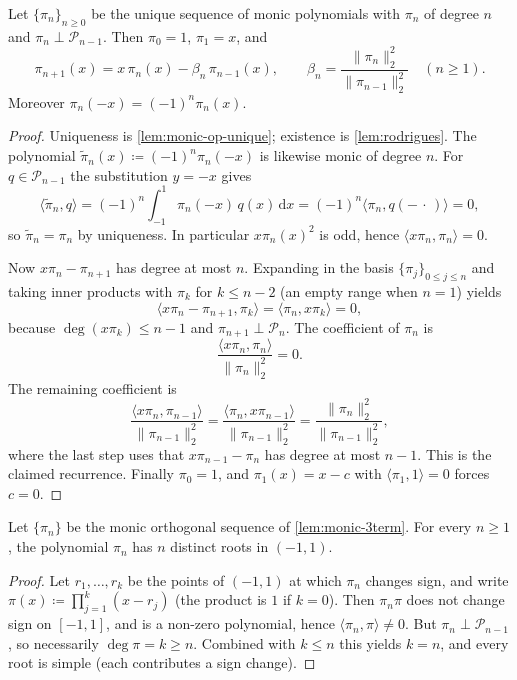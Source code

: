 \documentclass[11pt,a4paper]{article}
\begin{document}
\begin{lemma}
\label{lem:monic-3term}
Let \(\{\pi_{n}\}_{n\ge 0}\) be the unique sequence of monic polynomials with \(\pi_{n}\) of degree \(n\) and \(\pi_{n}\perp\mathcal{P}_{n-1}\). Then \(\pi_{0}=1\), \(\pi_{1}=x\), and
\[
\pi_{n+1}(x)
=
x\,\pi_{n}(x)
-
\beta_{n}\,\pi_{n-1}(x),
\qquad
\beta_{n}
=
\frac{\|\pi_{n}\|_{2}^{2}}{\|\pi_{n-1}\|_{2}^{2}}
\quad(n\ge 1).
\]
Moreover \(\pi_{n}(-x)=(-1)^{n}\pi_{n}(x)\).
\end{lemma}

\begin{proof}
Uniqueness is \cref{lem:monic-op-unique}; existence is \cref{lem:rodrigues}. The polynomial \(\widetilde{\pi}_{n}(x)\coloneqq(-1)^{n}\pi_{n}(-x)\) is likewise monic of degree \(n\). For \(q\in\mathcal{P}_{n-1}\) the substitution \(y=-x\) gives
\[
\langle\widetilde{\pi}_{n},q\rangle
=
(-1)^{n}
\int_{-1}^{1}\pi_{n}(-x)\,q(x)\,\mathrm{d}x
=
(-1)^{n}
\langle\pi_{n},q(-\,\cdot\,)\rangle
=
0,
\]
so \(\widetilde{\pi}_{n}=\pi_{n}\) by uniqueness. In particular \(x\pi_{n}(x)^{2}\) is odd, hence \(\langle x\pi_{n},\pi_{n}\rangle=0\).

Now \(x\pi_{n}-\pi_{n+1}\) has degree at most \(n\). Expanding in the basis \(\{\pi_{j}\}_{0\le j\le n}\) and taking inner products with \(\pi_{k}\) for \(k\le n-2\) (an empty range when \(n=1\)) yields
\[
\langle x\pi_{n}-\pi_{n+1},\pi_{k}\rangle
=
\langle\pi_{n},x\pi_{k}\rangle
=
0,
\]
because \(\deg(x\pi_{k})\le n-1\) and \(\pi_{n+1}\perp\mathcal{P}_{n}\). The coefficient of \(\pi_{n}\) is
\[
\frac{\langle x\pi_{n},\pi_{n}\rangle}{\|\pi_{n}\|_{2}^{2}}
=
0.
\]
The remaining coefficient is
\[
\frac{\langle x\pi_{n},\pi_{n-1}\rangle}{\|\pi_{n-1}\|_{2}^{2}}
=
\frac{\langle\pi_{n},x\pi_{n-1}\rangle}{\|\pi_{n-1}\|_{2}^{2}}
=
\frac{\|\pi_{n}\|_{2}^{2}}{\|\pi_{n-1}\|_{2}^{2}},
\]
where the last step uses that \(x\pi_{n-1}-\pi_{n}\) has degree at most \(n-1\). This is the claimed recurrence. Finally \(\pi_{0}=1\), and \(\pi_{1}(x)=x-c\) with \(\langle\pi_{1},1\rangle=0\) forces \(c=0\).
\end{proof}

\begin{lemma}
\label{lem:op-zeros}
Let \(\{\pi_{n}\}\) be the monic orthogonal sequence of \cref{lem:monic-3term}. For every \(n\ge 1\), the polynomial \(\pi_{n}\) has \(n\) distinct roots in \((-1,1)\).
\end{lemma}

\begin{proof}
Let \(r_{1},\ldots,r_{k}\) be the points of \((-1,1)\) at which \(\pi_{n}\) changes sign, and write \(\pi(x)\coloneqq\prod_{j=1}^{k}(x-r_{j})\) (the product is \(1\) if \(k=0\)). Then \(\pi_{n}\pi\) does not change sign on \([-1,1]\), and is a non-zero polynomial, hence \(\langle\pi_{n},\pi\rangle\neq 0\). But \(\pi_{n}\perp\mathcal{P}_{n-1}\), so necessarily \(\deg\pi=k\ge n\). Combined with \(k\le n\) this yields \(k=n\), and every root is simple (each contributes a sign change).
\end{proof}
\end{document}
